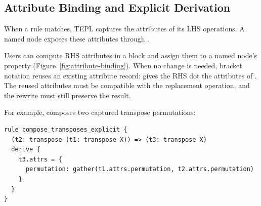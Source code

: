 \subsection{Attribute Binding and Explicit Derivation}
\label{sec:attribute-binding-and-explicit-derivation}

When a rule matches, TEPL captures the attributes of its LHS operations.
A named node exposes these attributes through .

Users can compute RHS attributes in a  block and assign
them to a named node's  property
(Figure~\ref{fig:attribute-binding}).
When no change is needed, bracket notation reuses an existing attribute
record:  gives the RHS dot the attributes of
. The reused attributes must be compatible with the replacement
operation, and the rewrite must still preserve the result.

\par\wrapstuffclear
\noindent\begin{minipage}{\linewidth}
For example,  composes two captured transpose permutations:
\begin{lstlisting}[language=TEPL]
rule compose_transposes_explicit {
  (t2: transpose (t1: transpose X)) => (t3: transpose X)
  derive {
    t3.attrs = {
      permutation: gather(t1.attrs.permutation, t2.attrs.permutation)
    }
  }
}
\end{lstlisting}
\end{minipage}

